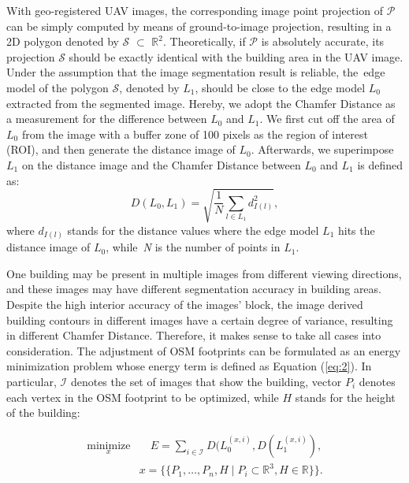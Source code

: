 With geo-registered UAV images, the corresponding image point projection of $\mathscr{P}$ can be simply computed by means of ground-to-image projection, resulting in a 2D polygon denoted by $\mathscr{S}$ $\subset$ $\mathbb{R}^2$. 
Theoretically, if $\mathscr{P}$ is absolutely accurate, its projection $\mathscr{S}$ should be exactly identical with the building area in the UAV image. Under the assumption that the image segmentation result is reliable, the~edge model of the polygon $\mathscr{S}$, denoted by $L_1$, should be close to the edge model $L_0$ extracted from the segmented image. Hereby, we adopt the Chamfer Distance \cite{BORGEFORS1986distance} as a measurement for the difference between $L_0$ and $L_1$. We first cut off the area of $L_0$ from the image with a buffer zone of 100 pixels as the region of interest (ROI), and then generate the distance image of $L_0$. Afterwards, we superimpose $L_1$ on the distance image and the Chamfer Distance between $L_0$ and $L_1$ is defined as:
\begin{equation} \label{eq:1}
D(L_0,L_1) = \sqrt{\frac{1}{N} \sum_{l\in L_1}^{} d_{I(l)}^2},
\end{equation}
where $d_{I(l)}$ stands for the distance values where the edge model $L_1$ hits the distance image of $L_0$, while~\emph{N} is the number of points in $L_1$. 

One building may be present in multiple images from different viewing directions, and these images may have different segmentation accuracy in building areas. Despite the high interior accuracy of the images' block, the image derived building contours in different images have a certain degree of variance, resulting in different Chamfer Distance. Therefore, it makes sense to take all cases into consideration. The adjustment of OSM footprints can be formulated as an energy minimization problem whose energy term is defined as Equation (\ref{eq:2}). In particular, $\mathscr{I}$ denotes the set of images that show the building, vector $P_{i}$ denotes each vertex in the OSM footprint to be optimized, while $H$ stands for the height of the building:

\begin{equation} \label{eq:2}
\begin{split}
 \underset{x}{\text{minimize}}  
& \quad E = \sum_{i\in \mathscr{I}^{}} D(L_{0}^{(x, i)}, D(L_{1}^{(x, i)}),\\
& x = \{\{ P_{1},  \ldots ,  P_{n}, H \mid  P_{i} \subset \mathbb{R}^3, H \in \mathbb{R}  \}\}.
\end{split}
\end{equation}

